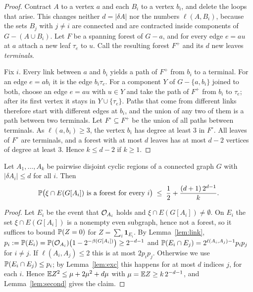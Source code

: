 \begin{proof}
Contract $A$ to a vertex $a$ and each $B_i$ to a vertex $b_i$, and delete the loops that arise.
This changes neither $d=|\delta A|$ nor the numbers $\ell(A,B_i)$, because the sets $B_j$ with
$j\ne i$ are connected and are contracted inside components of $G-(A\cup B_i)$. Let $F$ be a spanning forest of
$G-a$, and for every edge $e=au$ at $a$ attach a new leaf $\tau_e$ to $u$. Call the resulting forest
$F^{+}$ and its $d$ new leaves \emph{terminals}.

Fix $i$. Every link between $a$ and $b_i$ yields a path of $F^{+}$ from $b_i$ to a terminal. For an
edge $e=ab_i$ it is the edge $b_i\tau_e$. For a component $Y$ of $G-\{a,b_i\}$ joined to both, choose
an edge $e=au$ with $u\in Y$ and take the path of $F^{+}$ from $b_i$ to $\tau_e$; after its first
vertex it stays in $Y\cup\{\tau_e\}$. Paths that come from different links therefore start with
different edges at $b_i$, and the union of any two of them is a path between two terminals. Let
$F^{\circ}\subseteq F^{+}$ be the union of all paths between terminals. As $\ell(a,b_i)\ge3$, the
vertex $b_i$ has degree at least $3$ in $F^{\circ}$. All leaves of $F^{\circ}$ are terminals, and a
forest with at most $d$ leaves has at most $d-2$ vertices of degree at least $3$. Hence $k\le d-2$ if $k\ge1$.
\end{proof}

\begin{lemma}\label{lem:smallcuts}
Let $A_1,\dots,A_k$ be pairwise disjoint cyclic regions of a connected graph $G$ with
$|\delta A_i|\le d$ for all $i$. Then
\[
  \mathbb{P}\bigl(\xi\cap E(G[A_i])\text{ is a forest for every }i\bigr)\;\le\;\frac12+\frac{(d+1)\,2^{d-1}}{k}.
\]
\end{lemma}

\begin{proof}
Let $E_i$ be the event that $\mathcal{O}_{A_i}$ holds and $\xi\cap E(G[A_i])\ne\emptyset$. On $E_i$ the set
$\xi\cap E(G[A_i])$ is a nonempty even subgraph, hence not a forest, so it suffices to bound
$\mathbb{P}(Z=0)$ for $Z=\sum_i\mathbf{1}_{E_i}$. By Lemma~\ref{lem:link},
$p_i:=\mathbb{P}(E_i)=\mathbb{P}(\mathcal{O}_{A_i})\bigl(1-2^{-\beta(G[A_i])}\bigr)\ge2^{-d-1}$ and
$\mathbb{P}(E_i\cap E_j)=2^{\ell(A_i,A_j)-1}p_ip_j$ for $i\ne j$. If $\ell(A_i,A_j)\le2$ this is at most
$2p_ip_j$. Otherwise we use $\mathbb{P}(E_i\cap E_j)\le p_i$; by Lemma~\ref{lem:exc} this happens for at
most $d$ indices $j$, for each $i$. Hence $\mathbb{E} Z^{2}\le\mu+2\mu^{2}+d\mu$ with
$\mu=\mathbb{E} Z\ge k\,2^{-d-1}$, and Lemma~\ref{lem:second} gives the claim.
\end{proof}

